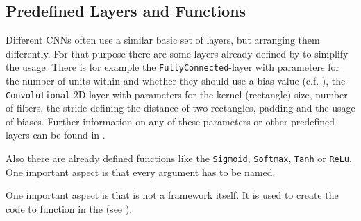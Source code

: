
\subsection{Predefined Layers and Functions} \label{subsec: CNNArchLang - predefines layers}
Different CNNs often use a similar basic set of layers, but arranging them differently. For that purpose there are some layers already defined by \cnnarch to simplify the usage.
There is for example the \texttt{FullyConnected}-layer with parameters for the number of units within and whether they should use a bias value (c.f. ), the \texttt{Convolutional}-2D-layer with parameters for the kernel (rectangle) size, number of filters, the stride defining the distance of two rectangles, padding and the usage of biases. Further information on any of these parameters or other predefined layers can be found in \cite{CNNArch}.

Also there are already defined functions like the \texttt{Sigmoid}, \texttt{Softmax}, \texttt{Tanh} or \texttt{ReLu}. 
One important aspect is that every argument has to be named. 

One important aspect is that \cnnarch is not a framework itself. It is used to create the code to function in the \mxnet (see ).

